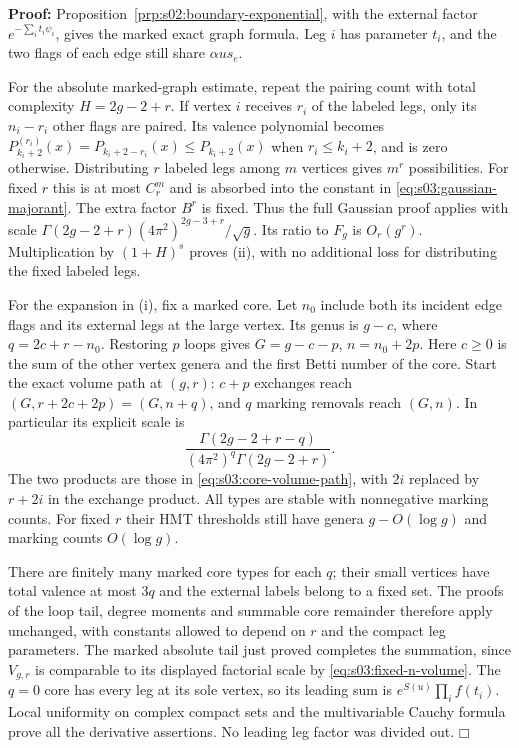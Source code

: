 \documentclass[a4paper,10pt]{article}
\numberwithin{equation}{section}
\theoremstyle{paperplain}
\theoremstyle{paperremark}
\theoremstyle{paperplain}
\newenvironment{prf}{\noindent \textbf{Proof: }}{\hfill $\mdlgwhtsquare$\par\addvspace{0.5\baselineskip}}
\begin{document}
\begin{prf}
Proposition~\ref{prp:s02:boundary-exponential}, with the external
factor $e^{-\sum_i t_i\psi_i}$, gives the marked exact graph
formula. Leg $i$ has parameter $t_i$, and the two flags of each
edge still share $\alpha u s_e$.

For the absolute marked-graph estimate, repeat the pairing count
with total complexity $H=2g-2+r$. If vertex $i$ receives $r_i$
of the labeled legs, only its $n_i-r_i$ other flags are paired.
Its valence polynomial becomes
$P_{k_i+2}^{(r_i)}(x)=P_{k_i+2-r_i}(x)\leq P_{k_i+2}(x)$
when $r_i\leq k_i+2$, and is zero otherwise. Distributing $r$
labeled legs among $m$ vertices gives $m^r$ possibilities.
For fixed $r$ this is at most $C_r^m$ and is absorbed into the
constant in \eqref{eq:s03:gaussian-majorant}. The extra factor
$B^r$ is fixed. Thus the full Gaussian proof applies with scale
$\Gamma(2g-2+r)(4\pi^2)^{2g-3+r}/\sqrt g$.
Its ratio to $F_g$ is $O_r(g^r)$. Multiplication by $(1+H)^s$
proves \textup{(ii)}, with no additional loss for distributing
the fixed labeled legs.

For the expansion in \textup{(i)}, fix a marked core. Let $n_0$
include both its incident edge flags and its external legs at the
large vertex. Its genus is $g-c$, where
$q=2c+r-n_0$. Restoring $p$ loops gives
$G=g-c-p$, $n=n_0+2p$. Here $c\geq0$ is the sum of the other
vertex genera and the first Betti number of the core.
Start the exact volume path at $(g,r)$: $c+p$ exchanges reach
$(G,r+2c+2p)=(G,n+q)$, and $q$ marking removals reach $(G,n)$.
In particular its explicit scale is
\begin{equation}
\label{eq:s03:marked-volume-scale}
\frac{\Gamma(2g-2+r-q)}
     {(4\pi^2)^q\Gamma(2g-2+r)}.
\end{equation}
The two products are those in \eqref{eq:s03:core-volume-path},
with $2i$ replaced by $r+2i$ in the exchange product.
All types are stable with nonnegative marking counts. For fixed
$r$ their HMT thresholds still have genera $g-O(\log g)$ and
marking counts $O(\log g)$.

There are finitely many marked core types for each $q$; their
small vertices have total valence at most $3q$ and the external
labels belong to a fixed set. The proofs of the loop tail, degree
moments and summable core remainder therefore apply unchanged,
with constants allowed to depend on $r$ and the compact leg
parameters. The marked absolute tail just proved completes the
summation, since $V_{g,r}$ is comparable to its displayed factorial
scale by \eqref{eq:s03:fixed-n-volume}. The $q=0$ core
has every leg at its sole vertex, so its leading sum is
$e^{S(u)}\prod_i f(t_i)$. Local uniformity on complex compact sets
and the multivariable Cauchy formula prove all the derivative
assertions. No leading leg factor was divided out.
\end{prf}
\end{document}
